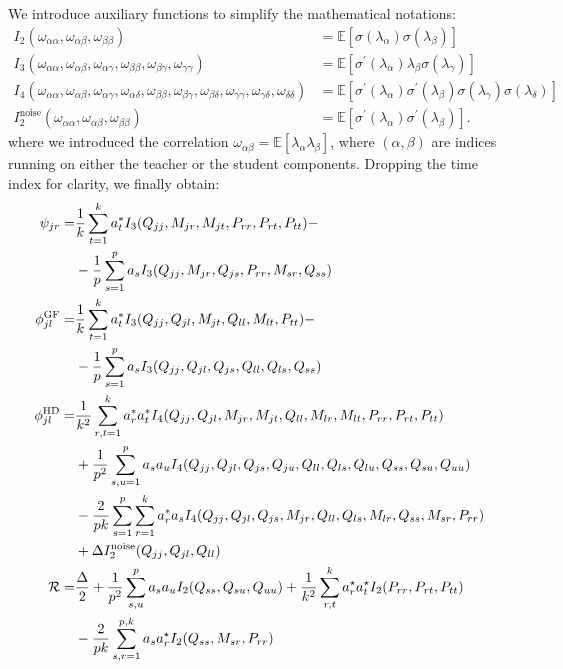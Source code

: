 We introduce auxiliary functions to simplify the mathematical notations: 
\begin{align*}
I_2(\omega_{\alpha\alpha},\omega_{\alpha\beta},\omega_{\beta\beta}) &=   \mathbb E\left[ \sigma(\lambda_\alpha)\sigma(\lambda_\beta)\right] \\
I_3(\omega_{\alpha\alpha},\omega_{\alpha\beta}, \omega_{\alpha\gamma},\omega_{\beta\beta}, \omega_{\beta\gamma},\omega_{\gamma\gamma}) &= \mathbb E\left[ \sigma^\prime(\lambda_\alpha) \lambda_\beta\sigma(\lambda_\gamma)\right]
\\
 I_4(
      \omega_{\alpha\alpha},
      \omega_{\alpha\beta},
      \omega_{\alpha\gamma},
      \omega_{\alpha\delta},
      \omega_{\beta\beta},
      \omega_{\beta\gamma},
      \omega_{\beta\delta},
      \omega_{\gamma\gamma},
      \omega_{\gamma\delta},
      \omega_{\delta\delta}
    ) &= \mathbb E\left[\sigma^\prime(\lambda_\alpha) \sigma^\prime(\lambda_\beta)\sigma(\lambda_\gamma)\sigma(\lambda_\delta)\right]  \\
I^\text{noise}_2(\omega_{\alpha\alpha},\omega_{\alpha\beta},\omega_{\beta\beta}) &= \mathbb E\left[\sigma^\prime(\lambda_\alpha) \sigma^\prime(\lambda_\beta)\right] .
\end{align*}
 where we introduced the correlation $\omega_{\alpha\beta} = \mathbb E [\lambda_\alpha \lambda_\beta]$, where $(\alpha , \beta)$ are indices running on either the teacher or the student components. Dropping the time index for clarity, we finally obtain:
\[\begin{split}
    \psi_{jr} =& \frac{1}{k}\sum_{t=1}^k a^*_t I_3(Q_{jj}, M_{jr}, M_{jt}, P_{rr}, P_{rt}, P_{tt}) -\\ &- \frac{1}{p}\sum_{s=1}^p a_sI_3(Q_{jj}, M_{jr}, Q_{js}, P_{rr}, M_{sr}, Q_{ss}) \\
    \phi^{\rm{GF}}_{jl} =&  \frac{1}{k}\sum_{t=1}^k a^*_t I_3(Q_{jj}, Q_{jl}, M_{jt}, Q_{ll}, M_{lt}, P_{tt}) -\\ &- \frac{1}{p}\sum_{s=1}^p a_s I_3(Q_{jj}, Q_{jl}, Q_{js}, Q_{ll}, Q_{ls}, Q_{ss}) \\
    \phi^{\rm{HD}}_{jl} =&
    \frac{1}{k^2} \sum_{r, t=1}^{k} a^*_r a^*_{t} I_4(Q_{jj}, Q_{jl}, M_{jr}, M_{jt}, Q_{ll}, M_{lr}, M_{lt}, P_{rr}, P_{rt}, P_{tt})\\
    & +\frac{1}{p^2} \sum_{s,u=1}^p a_s a_{u} I_4(Q_{jj}, Q_{jl}, Q_{js}, Q_{ju}, Q_{ll}, Q_{ls}, Q_{lu}, Q_{ss}, Q_{su}, Q_{uu})\\
    & -\frac{2}{pk} \sum_{s=1}^p \sum_{r=1}^k a^*_r a_s  I_4(Q_{jj}, Q_{jl}, Q_{js}, M_{jr}, Q_{ll}, Q_{ls}, M_{lr}, Q_{ss}, M_{sr}, P_{rr})\\
    & +\Delta  I^\text{noise}_2(Q_{jj},Q_{jl},Q_{ll})\\
    \mathcal{R} =& \frac\Delta2 + \frac{1}{p^2}\sum_{s,u}^p a_s a_u  I_2(Q_{ss},Q_{su},Q_{uu}) +
\frac{1}{k^2}\sum_{r,t}^k a^\star_r a^\star_t I_2(P_{rr},P_{rt},P_{tt})
\\
&-\frac{2}{pk} \sum_{s,r=1}^{p,k} a_s a^\star_r I_2(Q_{ss},M_{sr},P_{rr})
\end{split}\]

